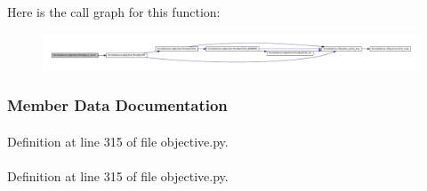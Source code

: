 \-Here is the call graph for this function\-:
\nopagebreak
\begin{figure}[H]
\begin{center}
\leavevmode
\includegraphics[width=350pt]{classforcebalance_1_1objective_1_1Penalty_ab59d5beafbab0918b7c3e0c61ece41a3_cgraph}
\end{center}
\end{figure}




\subsubsection{\-Member \-Data \-Documentation}
\hypertarget{classforcebalance_1_1objective_1_1Penalty_a27d10ae4d7dc4691170456ca7c2208c7}{
\paragraph[{a}]{}}\label{classforcebalance_1_1objective_1_1Penalty_a27d10ae4d7dc4691170456ca7c2208c7}


\-Definition at line 315 of file objective.\-py.

\hypertarget{classforcebalance_1_1objective_1_1Penalty_a90c9d0618d160aac6d2b30643087eb1c}{
\paragraph[{b}]{}}\label{classforcebalance_1_1objective_1_1Penalty_a90c9d0618d160aac6d2b30643087eb1c}


\-Definition at line 315 of file objective.\-py.

\hypertarget{classforcebalance_1_1objective_1_1Penalty_a29f26a2c093d2bff5514e246130d6a53}{
\paragraph[{fadd}]{}}\label{classforcebalance_1_1objective_1_1Penalty_a29f26a2c093d2bff5514e246130d6a53}


